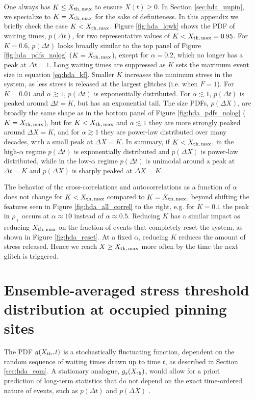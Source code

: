 \begin{subappendices}
One always has $K \leq X_{\rm th,\,max}$ to ensure $X(t)\geq 0$. In Section \ref{sec:hda_unpin}, we specialize to $K= X_{\rm th,\,max}$ for the sake of definiteness. In this appendix we briefly check the case $K < X_{\rm th,\,max}$. Figure \ref{fig:hda_lowk} shows the PDF of waiting times, $p(\Delta t)$, for two representative values of $K < X_{\rm th,\,max} = 0.95$. For $K=0.6$, $p(\Delta t)$ looks broadly similar to the top panel of Figure \ref{fig:hda_pdfs_nolog} ($K=X_{\rm th,\,max}$), except for $\alpha=0.2$, which no longer has a peak at $\Delta t = 1$. Long waiting times are suppressed as $K$ sets the maximum event size in equation \eqref{eq:hda_kf}. Smaller $K$ increases the minimum stress in the system, as less stress is released at the largest glitches (i.e. when $F=1$). For $K=0.01$ and $\alpha\gtrsim1$, $p(\Delta t)$ is exponentially distributed. For $\alpha\lesssim1$, $p(\Delta t)$ is peaked around $\Delta t = K$, but has an exponential tail. The size PDFs, $p(\Delta X)$, are broadly the same shape as in the bottom panel of Figure \ref{fig:hda_pdfs_nolog} ($K = X_{\rm th,\,max}$), but for $K < X_{\rm th,\,max}$ and $\alpha \lesssim 1$ they are more strongly peaked around $\Delta X = K$, and for $\alpha \gtrsim 1$ they are power-law distributed over many decades, with a small peak at $\Delta X = K$. In summary, if $K < X_{\rm th,\,max}$, in the high-$\alpha$ regime $p(\Delta t)$ is exponentially distributed and $p(\Delta X)$ is power-law distributed, while in the low-$\alpha$ regime $p(\Delta t)$ is unimodal around a peak at $\Delta t = K$ and $p(\Delta X)$ is sharply peaked at $\Delta X = K$.

The behavior of the cross-correlations and autocorrelations as a function of $\alpha$ does not change for $K < X_{\rm th,\,max}$ compared to $K = X_{\rm th,\,max}$, beyond shifting the features seen in Figure \ref{fig:hda_all_correl} to the right, e.g. for $K=0.1$ the peak in $\rho_+$ occurs at $\alpha \approx 10$ instead of $\alpha \approx 0.5$. Reducing $K$ has a similar impact as reducing $X_{\rm th,\,max}$ on the fraction of events that completely reset the system, as shown in Figure \ref{fig:hda_reset}. At a fixed $\alpha$, reducing $K$ reduces the amount of stress released. Hence we reach $X \geq X_{\rm th,\,max}$ more often by the time the next glitch is triggered. 

\section{Ensemble-averaged stress threshold distribution at occupied pinning sites} \label{sec:hda_gs}
The PDF $g(X_{\rm th}, t)$ is a stochastically fluctuating function, dependent on the random sequence of waiting times drawn up to time $t$, as described in Section \ref{sec:hda_eom}. A stationary analogue, $g_s(X_{\rm th})$, would allow for a priori prediction of long-term statistics that do not depend on the exact time-ordered nature of events, such as $p(\Delta t)$ and $p(\Delta X)$ \citep{Sneppen1997, Melatos2009}.


\end{subappendices}
